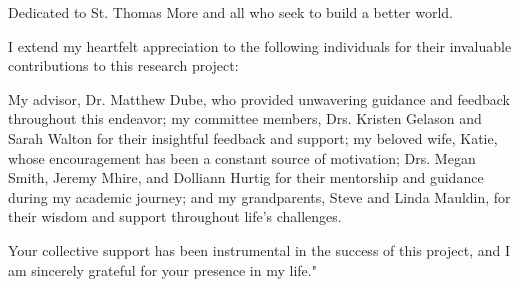 \begin{dedication}
Dedicated to St. Thomas More and all who seek to build a better world.
\end{dedication}

\begin{acknowledgements}
I extend my heartfelt appreciation to the following individuals for their invaluable contributions to this research project:
    
    My advisor, Dr. Matthew Dube, who provided unwavering guidance and feedback throughout this endeavor; my committee members, Drs. Kristen Gelason and Sarah Walton for their insightful feedback and support; my beloved wife, Katie, whose encouragement has been a constant source of motivation; Drs. Megan Smith, Jeremy Mhire, and Dolliann Hurtig for their mentorship and guidance during my academic journey; and my grandparents, Steve and Linda Mauldin, for their wisdom and support throughout life's challenges.
    
    Your collective support has been instrumental in the success of this project, and I am sincerely grateful for your presence in my life."
\end{acknowledgements}

\pagebreak

\tableofcontents

\pagebreak

\listoftables	

\pagebreak
\listoffigures		
\pagebreak		%



\mainmatter

\endinput
